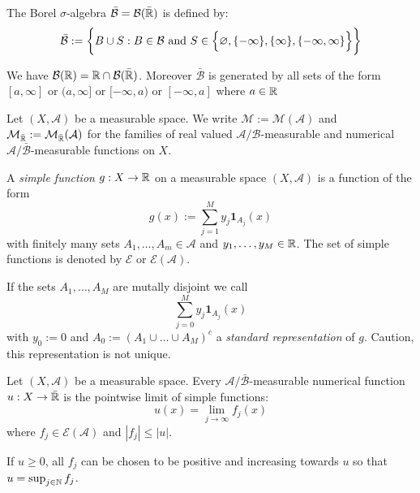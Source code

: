 \begin{defn}
The Borel \(\sigma \)-algebra \(\bar{\mathcal{B}}=\mathcal{B}(\bar{\Bbb{R}})\) is defined by:
\[
\bar{\mathcal{B}}:=\bigg\{B\cup S : B\in \mathcal{B}\space  \text{ and }\space S\in \Big\{\varnothing ,\{-\infty \},\{\infty \},\{-\infty ,\infty \}\Big\}\bigg\}
\]
\end{defn}

\begin{thm}
We have \(\mathcal{B}(\Bbb{R})=\Bbb{R}\cap \mathcal{B}(\bar{\Bbb{R}})\). Moreover \(\bar{\mathcal{B}}\) is generated by all sets of the form \([a,\infty ]\) or \((a,\infty ]\) or \([-\infty ,a)\) or \([-\infty ,a]\) where \(a\in \Bbb{R}\)
\end{thm}

\begin{defn}
Let \((X,\mathcal{A})\) be a measurable space. We write \(\mathcal{M}:=\mathcal{M}(\mathcal{A})\) and \(\mathcal{M}_{\bar{\Bbb{R}}}:=\mathcal{M}_{\bar{\Bbb{R}}}(\mathcal{A})\) for the families of real valued \(\mathcal{A}/\mathcal{B}\)-measurable and numerical \(\mathcal{A}/\bar{\mathcal{B}}\)-measurable functions on \(X\).
\end{defn}

\begin{defn}
A \emph{simple function} \(g:X\rightarrow \Bbb{R}\) on a measurable space \((X,\mathcal{A})\) is a function of the form
\[
g(x):=\sum _{j=1}^M y_{j}\mathbf{1}_{A_{j}}(x)
\]
with finitely many sets \(A_{1},\ldots ,A_{m}\in \mathcal{A}\) and \(y_{1},\ldots ,y_M\in \Bbb{R}\). The set of simple functions is denoted by \(\mathcal{E}\) or \(\mathcal{E}(\mathcal{A})\).

If the sets \(A_{1},\ldots ,A_M\) are mutally disjoint we call
\[
\sum _{j=0}^M y_{j}\mathbf{1}_{A_{j}}(x)
\]
with \(y_{0}:=0\) and \(A_{0}:=(A_{1}\cup \ldots \cup A_M)^c\) a \emph{standard representation} of \(g\). Caution, this representation is not unique.
\end{defn}

\begin{thm}
Let \((X,\mathcal{A})\) be a measurable space. Every \(\mathcal{A}/\bar{\mathcal{B}}\)-measurable numerical function \(u:X\rightarrow \bar{\Bbb{R}}\) is the pointwise limit of simple functions:
\[
u(x)=\lim_{j\rightarrow \infty }f_{j}(x)
\]
where \(f_{j}\in \mathcal{E}(\mathcal{A})\) and \(|f_{j}|\leq |u|.\)

If \(u\geq 0\), all \(f_{j}\) can be chosen to be positive and increasing towards \(u\) so that \(u=\sup_{j\in \Bbb{N}}f_{j}\).
\end{thm}

